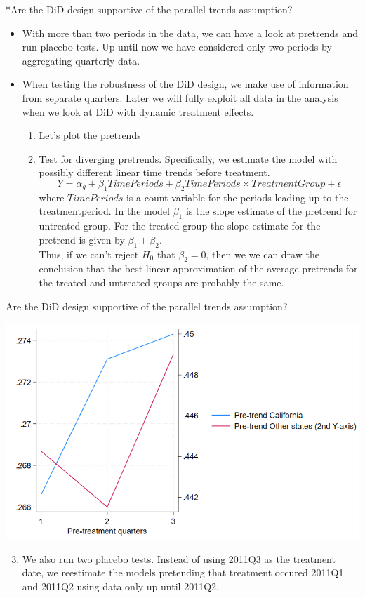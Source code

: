 \documentclass[notes,11pt, aspectratio=169]{beamer}
\begin{document}
\begin{frame}{*Are the DiD design supportive of the parallel trends assumption?}
    \begin{itemize}
\item With more than two periods in the data, we can have a look at pretrends and run placebo tests. Up until now we have considered only two periods by aggregating quarterly data. 
\item When testing the robustness of the DiD design, we make use of information from separate quarters. Later we will fully exploit all data in the analysis when we look at DiD with dynamic treatment effects.

\begin{enumerate}
    \item Let's plot the pretrends
    \item Test for diverging pretrends. Specifically, we estimate the model with possibly different linear time trends before treatment. 
    \begin{equation}
    Y = \alpha_g + \beta_1 TimePeriods +\beta_2 TimePeriods\times TreatmentGroup + \epsilon 
    \end{equation}
    where $TimePeriods$ is a count variable for the periods leading up to the treatmentperiod. In the model $\beta_1$ is the slope estimate of the pretrend for untreated group. For the treated group the slope estimate for the pretrend is given by  $\beta_1 + \beta_2$.\\
    \vspace{0.2cm}
    Thus, if we can't reject $H_0$ that $\beta_2=0$, then we we can draw the conclusion that the best linear approximation of the average pretrends for the treated and untreated groups are probably the same.
\end{enumerate}
\end{itemize}
\end{frame}

\begin{frame}{Are the DiD design supportive of the parallel trends assumption?}
    \begin{center}
        \includegraphics[width=0.55\linewidth]{24_DiDLecture/24_DiDLecture_PreTrend.png}
    \end{center}
\begin{enumerate}
  \setcounter{enumi}{2}    
    \item We also run two placebo tests. Instead of using 2011Q3 as the treatment date, we reestimate the models pretending that treatment occured 2011Q1 and 2011Q2 using data only up until 2011Q2.
\end{enumerate}
\end{frame}
\end{document}
